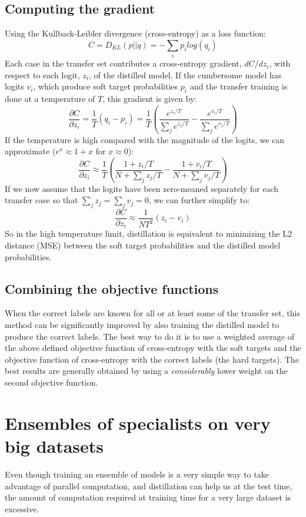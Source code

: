 \documentclass[a4paper,twocolumn]{article}
\begin{document}
\subsection{Computing the gradient}
Using the Kullback-Leibler divergence (cross-entropy) as a loss function:
\[
    C = D_{KL}(p||q) = - \sum_i p_i log(q_i)
\]
Each case in the transfer set contributes a cross-entropy gradient, $dC/dz_i$, with respect to each logit, $z_i$, of the distilled model. If the cumbersome model has logits $v_i$, which produce soft target probabilities $p_i$ and the transfer training is done at a temperature of $T$, this gradient is given by:
\[
    \frac{\partial C}{\partial z_i} = \frac{1}{T}(q_i - p_i) = \frac{1}{T}\left( \frac{e^{z_i/T}}{\sum_j e^{z_j/T}} - \frac{e^{v_i/T}}{\sum_j e^{v_j/T}} \right)
\]
If the temperature is high compared with the magnitude of the logits, we can approximate ($e^x \approx 1+x$ for $x \approx 0$):
\[
    \frac{\partial C}{\partial z_i} \approx \frac{1}{T}\left( \frac{1 + z_i/T}{N + \sum_j z_j/T} - \frac{1 + v_i/T}{N + \sum_j v_j/T} \right)
\]
If we now assume that the logits have been zero-meaned separately for each transfer case so that $\sum_j z_j = \sum_j v_j = 0$, we can further simplify to:
\[
    \frac{\partial C}{\partial z_i} \approx \frac{1}{NT^2} (z_i - v_i)
\]
So in the high temperature limit, distillation is equivalent to minimizing the L2 distance (MSE) between the soft target probabilities and the distilled model probabilities.

\subsection{Combining the objective functions}
When the correct labels are known for all or at least some of the transfer set, this method can be significantly improved by also training the distilled model to produce the correct labels. The best way to do it is to use a weighted average of the above defined objective function of cross-entropy with the soft targets and the objective function of cross-entropy with the correct labels (the hard targets). The best results are generally obtained by using a \textit{considerably} lower weight on the second objective function.

\section{Ensembles of specialists on very big datasets}
Even though training an ensemble of models is a very simple way to take advantage of parallel computation, and distillation can help us at the test time, the amount of computation required at training time for a very large dataset is excessive.
\end{document}
